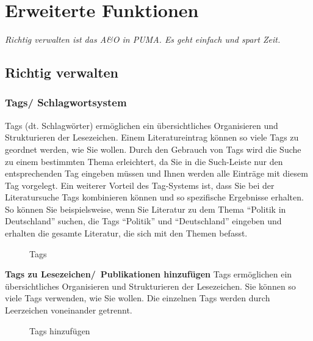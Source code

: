 \chapter{Erweiterte Funktionen}
\textit{Richtig verwalten ist das A\&O in PUMA. Es geht einfach und spart Zeit.}
\section{Richtig verwalten}

\subsection{Tags/ Schlagwortsystem}
\label{subsec:tags}
Tags (dt. Schlagwörter) ermöglichen ein übersichtliches Organisieren und Strukturieren der Lesezeichen. Einem Literatureintrag können so viele Tags zu geordnet werden, wie Sie wollen. Durch den Gebrauch von Tags wird die Suche zu einem bestimmten Thema erleichtert, da Sie in die Such-Leiste nur den entsprechenden Tag eingeben müssen und Ihnen werden alle Einträge mit diesem Tag vorgelegt. Ein weiterer Vorteil des Tag-Systems ist, dass Sie bei der Literatursuche Tags kombinieren können und so spezifische Ergebnisse erhalten. So können Sie beispielsweise, wenn Sie Literatur zu dem Thema \enquote{Politik in Deutschland} suchen, die Tags \enquote{Politik} und \enquote{Deutschland} eingeben und erhalten die gesamte Literatur, die sich mit den Themen befasst. 
\begin{figure}[h!]
 \centering
 \caption{Tags}
 \label{figure025}
\end{figure}
\textbf{Tags zu Lesezeichen/~Publikationen hinzufügen}\newline
Tags ermöglichen ein übersichtliches Organisieren und Strukturieren der Lesezeichen. Sie können so viele Tags verwenden, wie Sie wollen. Die einzelnen Tags werden durch Leerzeichen voneinander getrennt.
\begin{figure}[h!]
 \centering
 \caption{Tags hinzufügen}
 \label{figure026}
\end{figure} 
